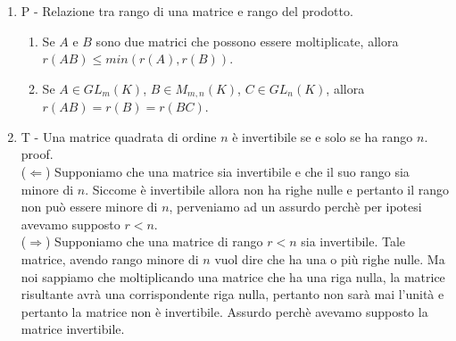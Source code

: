 \documentclass[]{article}
\begin{document}
\begin{enumerate}
			  Puoi scambiare algebricamente due righe $A^{(t)}$ e $A^{(s)}$ e dichiarare a parole che il rango di un insieme di vettori non dipende dall'ordine in cui prendo i vettori. In altre parole, se ${v_1,v_2}$ sono lin. ind. (rango 2) allora anche ${v_2, v_1}$ sono lin. ind. (sempre rango 2). \\
			  CASO 2 \\
			  Qui dobbiamo pensare al fatto che un vettore "rappresenta" una classe di vettori ovvero con esso possiamo ricavare tutti i suoi multipli allora bisogna dire che: prendiamo due vettori lin. ind. $v_1$ e $v_2$, allora tutti i multipli di $v_1$ sono lin. ind. a $v_2$ e viceversa. \\
			  Possiamo usare la stessa tecnica del CASO 1 e cio\`e effettuiamo una formalizzazione algebrica e dichiariamo a parole che ancora $r(A)=r(B)$. \\
			  CASO 3 \\
			  Qui bisogna utilizzare la doppia inclusione ovvero se $a \subset b$ e $b \subset a$ allora $b=a$. Chi sono $a$ e $b$ in questo contesto? mi sono perso sulle colonne!!! perch\`e c'\`e sempre quel fatto dell'inversione?!!!?	
	\item P - Relazione tra rango di una matrice e rango del prodotto.
			  \begin{enumerate}
			  	\item Se $A$ e $B$ sono due matrici che possono essere moltiplicate, allora $r(AB) \le min(r(A), r(B))$.
			  	\item Se $A \in GL_m(K)$, $B \in M_{m,n}(K)$, $C \in GL_n(K)$, allora $r(AB)=r(B)=r(BC)$.
			  \end{enumerate}		  
	\item T - Una matrice quadrata di ordine $n$ \`e invertibile se e solo se ha rango $n$. \\
			  proof. \\
			  ($\Leftarrow$) Supponiamo che una matrice sia invertibile e che il suo rango sia minore di $n$. Siccome \`e invertibile allora non ha righe nulle e pertanto il rango non pu\`o essere minore di $n$, perveniamo ad un assurdo perch\`e per ipotesi avevamo supposto $r<n$. \\
			  ($\Rightarrow$) Supponiamo che una matrice di rango $r<n$ sia invertibile. Tale matrice, avendo rango minore di $n$ vuol dire che ha una o pi\`u righe nulle. Ma noi sappiamo che moltiplicando una matrice che ha una riga nulla, la matrice risultante avr\`a una corrispondente riga nulla, pertanto non sar\`a mai l'unit\`a e pertanto la matrice non \`e invertibile. Assurdo perch\`e avevamo supposto la matrice invertibile. \\

\end{enumerate}
\end{document}
